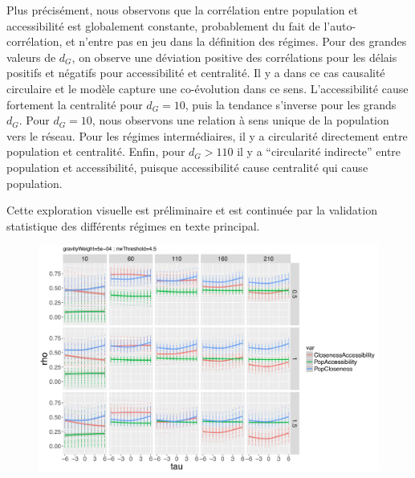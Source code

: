 Plus précisément, nous observons que la corrélation entre population et accessibilité est globalement constante, probablement du fait de l'auto-corrélation, et n'entre pas en jeu dans la définition des régimes. Pour des grandes valeurs de $d_G$, on observe une déviation positive des corrélations pour les délais positifs et négatifs pour accessibilité et centralité. Il y a dans ce cas causalité circulaire et le modèle capture une co-évolution dans ce sens. L'accessibilité cause fortement la centralité pour $d_G = 10$, puis la tendance s'inverse pour les grands $d_G$. Pour $d_G = 10$, nous observons une relation à sens unique de la population vers le réseau. Pour les régimes intermédiaires, il y a circularité directement entre population et centralité. Enfin, pour $d_G > 110$ il y a ``circularité indirecte'' entre population et accessibilité, puisque accessibilité cause centralité qui cause population.

Cette exploration visuelle est préliminaire et est continuée par la validation statistique des différents régimes en texte principal.



\begin{figure}
\includegraphics[width=\linewidth]{Figures/Final/A-macrocoevol-laggedcorrs.jpg}
\end{figure}



